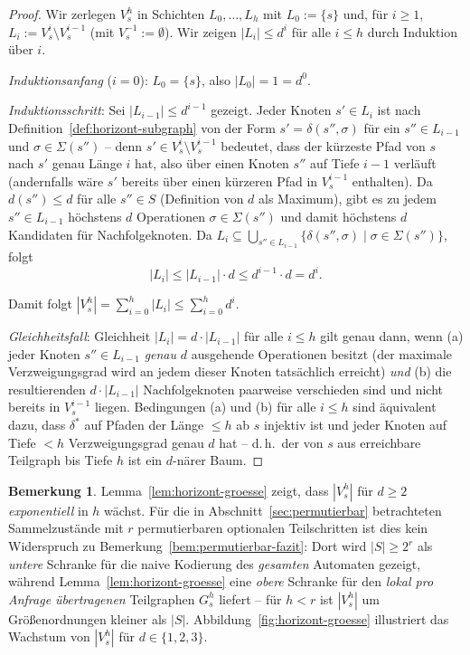 ﻿\documentclass[a4paper,12pt]{article}
\theoremstyle{definition}
\newtheorem{bemerkung}{Bemerkung}
\begin{document}
\begin{proof}
	Wir zerlegen $V_s^h$ in Schichten $L_0,\ldots,L_h$ mit $L_0:=\{s\}$ und, für
	$i\ge1$, $L_i:=V_s^i\setminus V_s^{i-1}$ (mit $V_s^{-1}:=\emptyset$). Wir zeigen
	$|L_i|\le d^i$ für alle $i\le h$ durch Induktion über $i$.

	\emph{Induktionsanfang} ($i=0$): $L_0=\{s\}$, also $|L_0|=1=d^0$.

	\emph{Induktionsschritt}: Sei $|L_{i-1}|\le d^{i-1}$ gezeigt. Jeder Knoten
	$s'\in L_i$ ist nach Definition~\ref{def:horizont-subgraph} von der Form
	$s'=\delta(s'',\sigma)$ für ein $s''\in L_{i-1}$ und $\sigma\in\Sigma(s'')$ -- denn
	$s'\in V_s^i\setminus V_s^{i-1}$ bedeutet, dass der kürzeste Pfad von $s$ nach $s'$
	genau Länge $i$ hat, also über einen Knoten $s''$ auf Tiefe $i-1$ verläuft
	(andernfalls wäre $s'$ bereits über einen kürzeren Pfad in $V_s^{i-1}$ enthalten).
	Da $d(s'')\le d$ für alle $s''\in S$ (Definition von $d$ als Maximum), gibt es zu
	jedem $s''\in L_{i-1}$ höchstens $d$ Operationen $\sigma\in\Sigma(s'')$ und damit
	höchstens $d$ Kandidaten für Nachfolgeknoten. Da
	$L_i\subseteq\bigcup_{s''\in L_{i-1}}\{\delta(s'',\sigma)\mid\sigma\in\Sigma(s'')\}$,
	folgt
	\[
		|L_i| \le |L_{i-1}|\cdot d \le d^{i-1}\cdot d = d^i.
	\]

	Damit folgt $|V_s^h|=\sum_{i=0}^{h}|L_i|\le\sum_{i=0}^{h}d^i$.

	\emph{Gleichheitsfall}: Gleichheit $|L_i|=d\cdot|L_{i-1}|$ für alle $i\le h$ gilt
	genau dann, wenn (a) jeder Knoten $s''\in L_{i-1}$ \emph{genau} $d$ ausgehende
	Operationen besitzt (der maximale Verzweigungsgrad wird an jedem dieser Knoten
	tatsächlich erreicht) \emph{und} (b) die resultierenden $d\cdot|L_{i-1}|$
	Nachfolgeknoten paarweise verschieden sind und nicht bereits in $V_s^{i-1}$ liegen.
	Bedingungen (a) und (b) für alle $i\le h$ sind äquivalent dazu, dass $\delta^{*}$ auf
	Pfaden der Länge $\le h$ ab $s$ injektiv ist und jeder Knoten auf Tiefe $<h$
	Verzweigungsgrad genau $d$ hat -- d.\,h.\ der von $s$ aus erreichbare Teilgraph bis
	Tiefe $h$ ist ein $d$-närer Baum. \qedhere
\end{proof}

\begin{bemerkung}
	\label{bem:horizont-groesse-praxis}
	Lemma~\ref{lem:horizont-groesse} zeigt, dass $|V_s^h|$ für $d\ge2$
	\emph{exponentiell} in $h$ wächst. Für die in Abschnitt~\ref{sec:permutierbar}
	betrachteten Sammelzustände mit $r$ permutierbaren optionalen Teilschritten ist dies
	kein Widerspruch zu Bemerkung~\ref{bem:permutierbar-fazit}: Dort wird $|S|\ge2^r$ als
	\emph{untere} Schranke für die naive Kodierung des \emph{gesamten} Automaten gezeigt,
	während Lemma~\ref{lem:horizont-groesse} eine \emph{obere} Schranke für den
	\emph{lokal pro Anfrage übertragenen} Teilgraphen $G_s^h$ liefert -- für $h<r$ ist
	$|V_s^h|$ um Größenordnungen kleiner als $|S|$. Abbildung~\ref{fig:horizont-groesse}
	illustriert das Wachstum von $|V_s^h|$ für $d\in\{1,2,3\}$.
\end{bemerkung}
\end{document}
